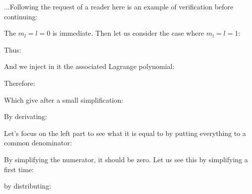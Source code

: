 	...Following the request of a reader here is an example of verification before continuing:
	
	The $m_l=l=0$ is immediate. Then let us consider the case where $m_l=l=1$:
	
	Thus:
	
	And we inject in it the associated Lagrange polynomial:
	
	Therefore:
	
	Which give after a small simplification:
	
	By derivating:
	
	Let's focus on the left part to see what it is equal to by putting everything to a common denominator:
	
	By simplifying the numerator, it should be zero. Let us see this by simplifying a first time:
	
	by distributing:
	
